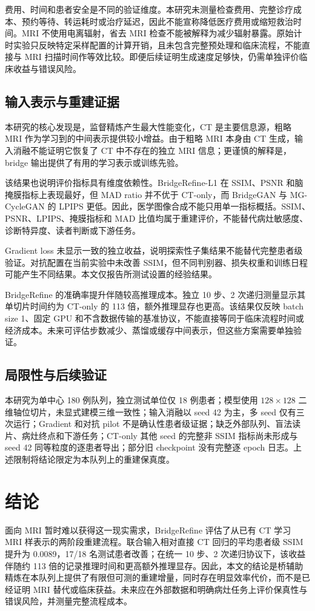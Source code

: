 \documentclass[UTF8,11pt,a4paper]{ctexart}
\begin{document}
费用、时间和患者安全是不同的验证维度。本研究未测量检查费用、完整诊疗成本、预约等待、转运耗时或治疗延迟，因此不能宣称降低医疗费用或缩短救治时间。MRI 不使用电离辐射，省去 MRI 检查不能被解释为减少辐射暴露。原始计时实验只反映特定采样配置的计算开销，且未包含完整预处理和临床流程，不能直接与 MRI 扫描时间作等效比较。即便后续证明生成速度足够快，仍需单独评价临床收益与错误风险。

\subsection{输入表示与重建证据}
本研究的核心发现是，监督精炼产生最大性能变化，CT 是主要信息源，粗略 MRI 作为学习到的中间表示提供较小增益。由于粗略 MRI 本身由 CT 生成，输入消融不能证明它恢复了 CT 中不存在的独立 MRI 信息；更谨慎的解释是，bridge 输出提供了有用的学习表示或训练先验。

该结果也说明评价指标具有维度依赖性。BridgeRefine-L1 在 SSIM、PSNR 和脑掩膜指标上表现最好，但 MAD ratio 并不优于 CT-only，而 BridgeGAN 与 MG-CycleGAN 的 LPIPS 更低。因此，医学图像合成不能只用单一指标概括。SSIM、PSNR、LPIPS、掩膜指标和 MAD 比值均属于重建评价，不能替代病灶敏感度、诊断特异度、读者判断或下游任务。

Gradient loss 未显示一致的独立收益，说明探索性子集结果不能替代完整患者级验证。对抗配置在当前实验中未改善 SSIM，但不同判别器、损失权重和训练日程可能产生不同结果。本文仅报告所测试设置的经验结果。

BridgeRefine 的准确率提升伴随较高推理成本。独立 10 步、2 次递归测量显示其单切片时间约为 CT-only 的 113 倍，额外推理显存也更高。该结果仅反映 batch size 1、固定 GPU 和不含数据传输的基准协议，不能直接等同于临床流程时间或经济成本。未来可评估步数减少、蒸馏或缓存中间表示，但这些方案需要单独验证。

\subsection{局限性与后续验证}
本研究为单中心 180 例队列，独立测试单位仅 18 例患者；模型使用 $128\times128$ 二维轴位切片，未显式建模三维一致性；输入消融以 seed 42 为主，多 seed 仅有三次运行；Gradient 和对抗 pilot 不是确认性患者级证据；缺乏外部队列、盲法读片、病灶终点和下游任务；CT-only 其他 seed 的完整非 SSIM 指标尚未形成与 seed 42 同等粒度的逐患者导出；部分旧 checkpoint 没有完整逐 epoch 日志。上述限制将结论限定为本队列上的重建保真度。

\section{结论}
面向 MRI 暂时难以获得这一现实需求，BridgeRefine 评估了从已有 CT 学习 MRI 样表示的两阶段重建流程。联合输入相对直接 CT 回归的平均患者级 SSIM 提升为 0.0089，17/18 名测试患者改善；在统一 10 步、2 次递归协议下，该收益伴随约 113 倍的记录推理时间和更高额外推理显存。因此，本文的结论是桥辅助精炼在本队列上提供了有限但可测的重建增量，同时存在明显效率代价，而不是已经证明 MRI 替代或临床获益。未来应在外部数据和明确病灶任务上评价保真性与错误风险，并测量完整流程成本。
\end{document}
